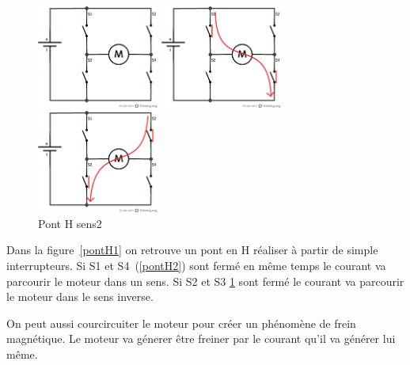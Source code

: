 \documentclass[10pt,a4paper]{article}
\begin{document}
\begin{figure}[!h]
   \begin{minipage}[c]{.33\linewidth}
      \centering
      \includegraphics[width=4cm]{images/pontH1}
      \caption{\label{pontH1} Pont en H simple}
   \end{minipage}
   \begin{minipage}[c]{.33\linewidth}
      \centering
      \includegraphics[width=4cm]{images/pontH2}
      \caption{\label{pontH2} Pont H sens 1}
   \end{minipage}
   \begin{minipage}[c]{.33\linewidth}
       \centering
       \includegraphics[width=4cm]{images/pontH3}
       \caption{\label{pontH3} Pont H sens2}
   \end{minipage}
\end{figure}

Dans la figure~\ref{pontH1} on retrouve un pont en H réaliser à partir de simple interrupteurs. Si
S1 et S4 (\ref{pontH2}) sont fermé en même temps le courant va parcourir le moteur dans un sens. Si S2
et S3 \ref{pontH3} sont fermé le courant va parcourir le moteur dans le sens inverse.

On peut aussi courcircuiter le moteur pour créer un phénomène de frein magnétique. Le moteur va
génerer être freiner par le courant qu'il va générer lui même. 
\end{document}
